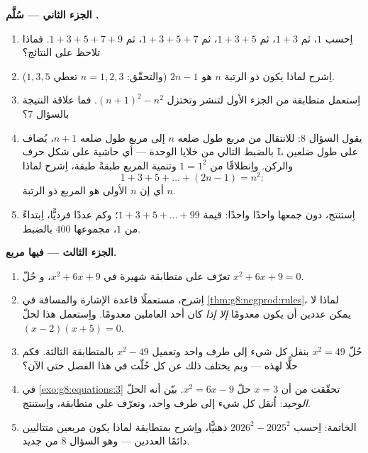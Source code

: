 \begin{problem}[{مسألة نهاية الأسبوع --- $(a+b)^2$ و $(a-b)^2$
و $(a+b)(a-b)$، والمجموع $1 + 3 + 5 + \dots + (2n-1) = n^2$}]
\medskip
\noindent\textbf{الجزء الثاني --- سُلَّم .}
\begin{enumerate}[resume]
  \item اِحسب $1$، ثم $1 + 3$، ثم $1 + 3 + 5$، ثم
        $1 + 3 + 5 + 7$، ثم $1 + 3 + 5 + 7 + 9$. فماذا
        تلاحظ على النتائج؟
  \item اِشرح لماذا يكون  ذو الرتبة $n$ هو $2n - 1$ (والتحقّق:
        $n = 1, 2, 3$ تعطي $1, 3, 5$).
  \item اِستعمل متطابقة من الجزء الأول لتنشر وتختزل
        $(n + 1)^2 - n^2$. فما علاقة النتيجة
        بالسؤال 7؟
  \item يقول السؤال 8: للانتقال من مربع طول ضلعه $n$ إلى
        مربع طول ضلعه $n + 1$، يُضاف بالضبط 
        التالي من خلايا الوحدة --- أي حاشية على شكل حرف L على طول ضلعين
        والركن. واِنطلاقًا من $1 = 1^2$ وتنمية
        المربع طبقةً طبقة، اِشرح لماذا
        \[
        1 + 3 + 5 + \dots + (2n - 1) = n^2 :
        \]
        أي إن   $n$ الأولى هو المربع ذو الرتبة $n$.
  \item اِستنتج، دون جمعها واحدًا واحدًا: قيمة
        $1 + 3 + 5 + \dots + 99$؛ وكم عددًا فرديًّا، اِبتداءً
        من $1$، مجموعها $400$ بالضبط.
\end{enumerate}

\medskip
\noindent\textbf{الجزء الثالث ---  فيها مربع.}
\begin{enumerate}[resume]
  \item تعرّف على متطابقة شهيرة في $x^2 + 6x + 9$، و
        حُلّ  $x^2 + 6x + 9 = 0$.
  \item اِشرح، مستعملًا قاعدة الإشارة والمسافة في
        \cref{thm:g8:negprod:rules}، لماذا لا يمكن  عددين
        أن يكون معدومًا \emph{إلا إذا} كان أحد العاملين معدومًا.
        واِستعمل هذا لحلّ $(x - 2)(x + 5) = 0$.
  \item حُلّ $x^2 = 49$ بنقل كل شيء إلى طرف واحد
        وتعميل $x^2 - 49$ بالمتطابقة الثالثة. فكم حلًّا
        لهذه  --- وبم يختلف ذلك
        عن كل  حُلّت في هذا الفصل حتى الآن؟
  \item في \cref{exo:g8:equations:3} تحقّقت من أن $x = 3$
        حلّ  $x^2 = 6x - 9$. بيّن أنه الحلّ
        \emph{الوحيد}: اُنقل كل شيء إلى طرف واحد، وتعرّف على
        متطابقة، واِستنتج.
  \item الخاتمة: اِحسب $2026^2 - 2025^2$ ذهنيًّا، واِشرح
        بمتطابقة لماذا يكون  مربعين
        متتاليين دائمًا  العددين
        --- وهو السؤال 8 من جديد.
\end{enumerate}
\end{problem}

